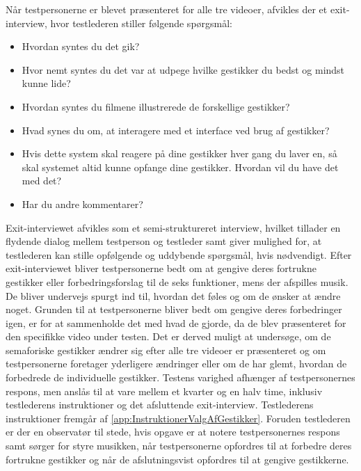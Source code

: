 Når testpersonerne er blevet præsenteret for alle tre videoer, afvikles der et exit-interview, hvor testlederen stiller følgende spørgsmål:\blankline
%
\begin{itemize}
  \item Hvordan syntes du det gik? 
  \item Hvor nemt syntes du det var at udpege hvilke gestikker du bedst og mindst kunne lide? 
  \item Hvordan syntes du filmene illustrerede de forskellige gestikker? 
  \item Hvad synes du om, at interagere med et interface ved brug af gestikker? 
  \item Hvis dette system skal reagere på dine gestikker hver gang du laver en, så skal systemet altid kunne opfange dine gestikker. Hvordan vil du have det med det? 
  \item Har du andre kommentarer?\blankline
\end{itemize}
\noindent
%
Exit-interviewet afvikles som et semi-struktureret interview, hvilket tillader en flydende dialog mellem testperson og testleder samt giver mulighed for, at testlederen kan stille opfølgende og uddybende spørgsmål, hvis nødvendigt. Efter exit-interviewet bliver testpersonerne bedt om at gengive deres fortrukne gestikker eller forbedringsforslag til de seks funktioner, mens der afspilles musik. De bliver undervejs spurgt ind til, hvordan det føles og om de ønsker at ændre noget. Grunden til at testpersonerne bliver bedt om gengive deres forbedringer igen, er for at sammenholde det med hvad de gjorde, da de blev præsenteret for den specifikke video under testen. Det er derved muligt at undersøge, om de semaforiske gestikker ændrer sig efter alle tre videoer er præsenteret og om testpersonerne foretager yderligere ændringer eller om de har glemt, hvordan de forbedrede de individuelle gestikker. \blankline   
%
Testens varighed afhænger af testpersonernes respons, men anslås til at vare mellem et kvarter og en halv time, inklusiv testlederens instruktioner og det afsluttende exit-interview. Testlederens instruktioner fremgår af \autoref{app:InstruktionerValgAfGestikker}. Foruden testlederen er der en observatør til stede, hvis opgave er at notere testpersonernes respons samt sørger for styre musikken, når testpersonerne opfordres til at forbedre deres fortrukne gestikker og når de afslutningsvist opfordres til at gengive gestikkerne. 
%
